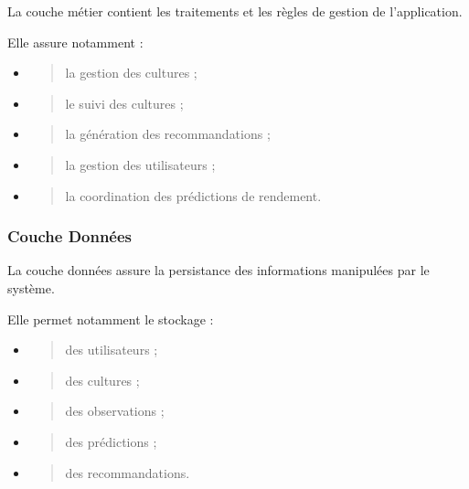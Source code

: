 \documentclass[
]{article}
\begin{document}
La couche métier contient les traitements et les règles de gestion de
l'application.

Elle assure notamment :

\begin{itemize}
\item
  \begin{quote}
  la gestion des cultures ;
  \end{quote}
\item
  \begin{quote}
  le suivi des cultures ;
  \end{quote}
\item
  \begin{quote}
  la génération des recommandations ;
  \end{quote}
\item
  \begin{quote}
  la gestion des utilisateurs ;
  \end{quote}
\item
  \begin{quote}
  la coordination des prédictions de rendement.
  \end{quote}
\end{itemize}

\hypertarget{couche-donnuxe9es}{%
\subsubsection{Couche Données}\label{couche-donnuxe9es}}

La couche données assure la persistance des informations manipulées par
le système.

Elle permet notamment le stockage :

\begin{itemize}
\item
  \begin{quote}
  des utilisateurs ;
  \end{quote}
\item
  \begin{quote}
  des cultures ;
  \end{quote}
\item
  \begin{quote}
  des observations ;
  \end{quote}
\item
  \begin{quote}
  des prédictions ;
  \end{quote}
\item
  \begin{quote}
  des recommandations.
  \end{quote}
\end{itemize}
\end{document}
